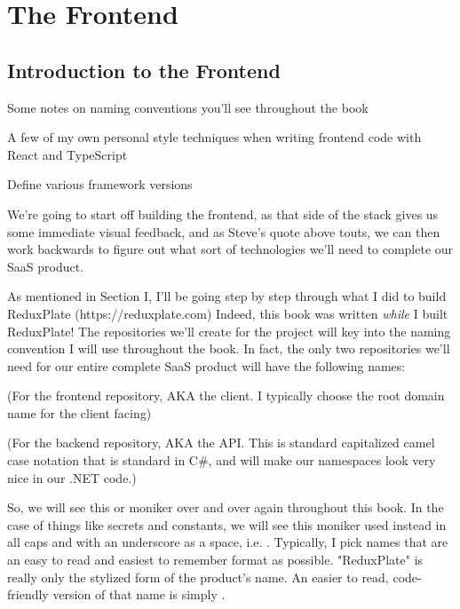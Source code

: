 \documentclass[a4paper,
                             oneside,
                             BCOR1.0cm,
                             DIV11,
                             parskip=full,
                             11pt]{scrbook}
\begin{document}
\chapter{The Frontend}\label{cap:primer}

\section{Introduction to the Frontend}\label{sec:titles}
\begin{arrows}
\item Some notes on naming conventions you'll see throughout the book
\item A few of my own personal style techniques when writing frontend code with React and TypeScript
\item Define various framework versions
\end{arrows}

We're going to start off building the frontend, as that side of the stack gives us some immediate visual feedback, and as Steve's quote above touts, we can then work backwards to figure out what sort of technologies  we'll need to complete our SaaS product. 


As mentioned in Section I, I'll be going step by step through what I did to build ReduxPlate (https://reduxplate.com) Indeed, this book was written \textit{while} I built ReduxPlate! The repositories we'll create for the project will key into the naming convention I will use throughout the book. In fact, the only two repositories we'll need for our entire complete SaaS product will have the following names:

 (For the frontend repository, AKA the client. I typically choose the root domain name for the client facing)

 (For the backend repository, AKA the API. This is standard capitalized camel case notation that is standard in C\#, and will make our namespaces look very nice in our .NET code.)

So, we will see this  or  moniker over and over again throughout this book. In the case of things like secrets and constants, we will see this moniker used instead in all caps and with an underscore as a space, i.e. . Typically, I pick names that are an easy to read and easiest to remember format as possible. "ReduxPlate" is really only the stylized form of the product's name. An easier to read, code-friendly version of that name is simply .
\end{document}
